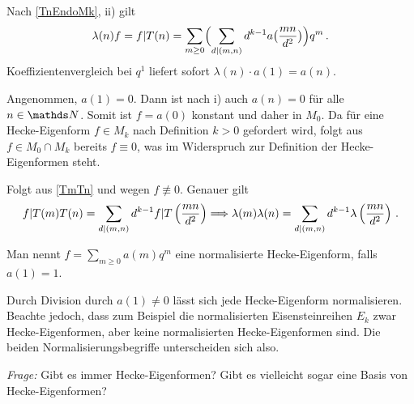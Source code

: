 \begin{bewe-list}
\item Nach \autoref{TnEndoMk}, ii) gilt
\[
\lambda(n) f = f | T(n) = \sum_{m \geq 0} \Bigl( \sum_{d \vert (m,n)} d^{k-1} a\bigl( \frac {mn}{d^2} \bigr) \Bigr) q^m
\,.
\]
Koeffizientenvergleich bei $q^1$ liefert sofort $\lambda (n) \cdot a(1) = a(n)$.
\item Angenommen, $a(1) = 0$. Dann ist nach i) auch $a(n) = 0$ für alle $n \in \NN$. Somit ist $f = a(0)$ konstant und daher in $M_0$. Da für eine Hecke-Eigenform $f \in M_k$ nach Definition $k > 0$ gefordert wird, folgt aus $f \in M_0 \cap M_k$ bereits $f \equiv 0$, was im Widerspruch zur Definition der Hecke-Eigenformen steht.
\item Folgt aus \autoref{TmTn} und wegen $f \not \equiv 0$. Genauer gilt
\[
f | T(m) T(n) = \sum_{d \vert (m,n)} d^{k-1} f | T \left( \frac{mn}{d^2} \right) \Longrightarrow \lambda(m) \lambda(n) = \sum_{d \vert (m,n)} d^{k-1} \lambda\left(\frac {mn}{d^2}\right)
\,.
\]
\end{bewe-list}

\begin{defi}
Man nennt $f = \sum_{m \geq 0} a(m) q^m$ eine normalisierte Hecke-Eigenform, falls $a(1) = 1$.
\end{defi}

\begin{beme}
Durch Division durch $a(1) \neq 0$ lässt sich jede Hecke-Eigenform normalisieren. Beachte jedoch, dass zum Beispiel die \glqq{}normalisierten Eisensteinreihen\grqq{} $E_k$ zwar Hecke-Eigenformen, aber keine normalisierten Hecke-Eigenformen sind. Die beiden Normalisierungsbegriffe unterscheiden sich also.
\end{beme}

\emph{Frage:} Gibt es immer Hecke-Eigenformen? Gibt es vielleicht sogar eine Basis von Hecke-Eigenformen?

